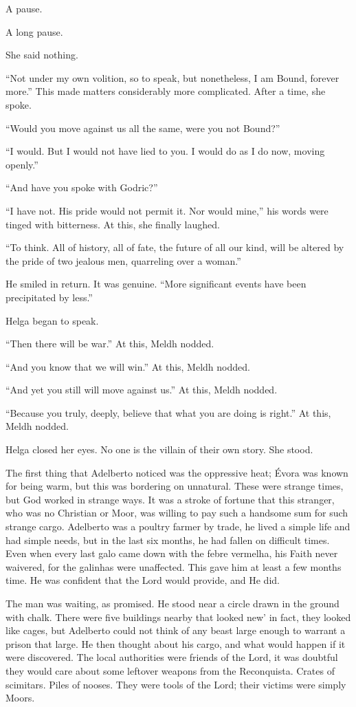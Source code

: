 A pause.

A long pause.

She said nothing.

“Not under my own volition, so to speak, but nonetheless, I am Bound, forever more.” This made matters considerably more complicated. After a time, she spoke.

“Would you move against us all the same, were you not Bound?”

“I would. But I would not have lied to you. I would do as I do now, moving openly.”

“And have you spoke with Godric?”

“I have not. His pride would not permit it. Nor would mine,” his words were tinged with bitterness. At this, she finally laughed.

“To think. All of history, all of fate, the future of all our kind, will be altered by the pride of two jealous men, quarreling over a woman.”

He smiled in return. It was genuine. “More significant events have been precipitated by less.”

Helga began to speak.

“Then there will be war.” At this, Meldh nodded.

“And you know that we will win.” At this, Meldh nodded.

“And yet you still will move against us.” At this, Meldh nodded.

“Because you truly, deeply, believe that what you are doing is right.” At this, Meldh nodded.

Helga closed her eyes. No one is the villain of their own story. She stood.
\simpleline
{}

The first thing that Adelberto noticed was the oppressive heat; Évora was known for being warm, but this was bordering on unnatural. These were strange times, but God worked in strange ways. It was a stroke of fortune that this stranger, who was no Christian or Moor, was willing to pay such a handsome sum for such strange cargo. Adelberto was a poultry farmer by trade, he lived a simple life and had simple needs, but in the last six months, he had fallen on difficult times. Even when every last galo came down with the febre vermelha, his Faith never waivered, for the galinhas were unaffected. This gave him at least a few months time. He was confident that the Lord would provide, and He did.

The man was waiting, as promised. He stood near a circle drawn in the ground with chalk. There were five buildings nearby that looked new’ in fact, they looked like cages, but Adelberto could not think of any beast large enough to warrant a prison that large. He then thought about his cargo, and what would happen if it were discovered. The local authorities were friends of the Lord, it was doubtful they would care about some leftover weapons from the Reconquista. Crates of scimitars. Piles of nooses. They were tools of the Lord; their victims were simply Moors.

